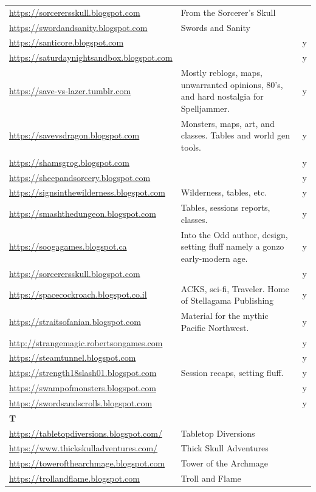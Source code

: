\documentclass[a4paper, 11pt, twoside]{article}
\begin{document}
\begin{longtable}{p{6cm}p{8cm}c}
\url{https://sorcerersskull.blogspot.com} & From the Sorcerer's Skull & \\
\url{https://swordandsanity.blogspot.com} & Swords and Sanity & \\
\url{https://santicore.blogspot.com} &  & y\\
\url{https://saturdaynightsandbox.blogspot.com} &  & y\\
\url{https://save-vs-lazer.tumblr.com} & Mostly reblogs, maps, unwarranted opinions, 80's, and hard nostalgia for Spelljammer. & y\\
\url{https://savevsdragon.blogspot.com} & Monsters, maps, art, and classes. Tables and world gen tools. & y\\
\url{https://shamsgrog.blogspot.com} &  & y\\
\url{https://sheepandsorcery.blogspot.com} &  & y\\
\url{https://signsinthewilderness.blogspot.com} & Wilderness, tables, etc. & y\\
\url{https://smashthedungeon.blogspot.com} & Tables, sessions reports, classes. & y\\
\url{https://soogagames.blogspot.ca} & Into the Odd author, design, setting fluff namely a gonzo early-modern age. & y\\
\url{https://sorcerersskull.blogspot.com} &  & y\\
\url{https://spacecockroach.blogspot.co.il} & ACKS, sci-fi, Traveler. Home of Stellagama Publishing & y\\
\url{https://straitsofanian.blogspot.com} & Material for the mythic Pacific Northwest. & y\\
\url{http://strangemagic.robertsongames.com} &  & y\\
\url{https://steamtunnel.blogspot.com} &  & y\\
\url{https://strength18slash01.blogspot.com} & Session recaps, setting fluff. & y\\
\url{https://swampofmonsters.blogspot.com} &  & y\\
\url{https://swordsandscrolls.blogspot.com} &  & y\\
\textbf{T} &  & \\
\url{https://tabletopdiversions.blogspot.com/} & Tabletop Diversions & \\
\url{https://www.thickskulladventures.com/} & Thick Skull Adventures & \\
\url{https://towerofthearchmage.blogspot.com} & Tower of the Archmage & \\
\url{https://trollandflame.blogspot.com} & Troll and Flame & \\

\end{longtable}
\end{document}
